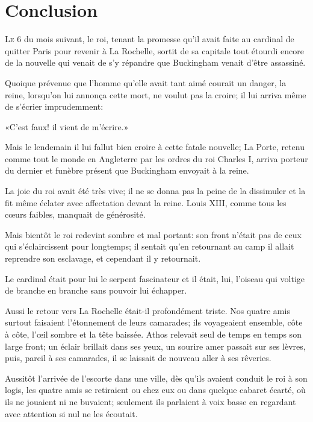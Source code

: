 
\chapter{Conclusion}

\lettrine{L}{e} 6 du mois suivant, le roi, tenant la promesse qu'il avait faite au cardinal de quitter Paris pour revenir à La Rochelle, sortit de sa capitale tout étourdi encore de la nouvelle qui venait de s'y répandre que Buckingham venait d'être assassiné. 

Quoique prévenue que l'homme qu'elle avait tant aimé courait un danger, la reine, lorsqu'on lui annonça cette mort, ne voulut pas la croire; il lui arriva même de s'écrier imprudemment: 

«C'est faux! il vient de m'écrire.» 

Mais le lendemain il lui fallut bien croire à cette fatale nouvelle; La Porte, retenu comme tout le monde en Angleterre par les ordres du roi Charles I\ier, arriva porteur du dernier et funèbre présent que Buckingham envoyait à la reine. 

La joie du roi avait été très vive; il ne se donna pas la peine de la dissimuler et la fit même éclater avec affectation devant la reine. Louis XIII, comme tous les cœurs faibles, manquait de générosité. 

Mais bientôt le roi redevint sombre et mal portant: son front n'était pas de ceux qui s'éclaircissent pour longtemps; il sentait qu'en retournant au camp il allait reprendre son esclavage, et cependant il y retournait. 

Le cardinal était pour lui le serpent fascinateur et il était, lui, l'oiseau qui voltige de branche en branche sans pouvoir lui échapper. 

Aussi le retour vers La Rochelle était-il profondément triste. Nos quatre amis surtout faisaient l'étonnement de leurs camarades; ils voyageaient ensemble, côte à côte, l'œil sombre et la tête baissée. Athos relevait seul de temps en temps son large front; un éclair brillait dans ses yeux, un sourire amer passait sur ses lèvres, puis, pareil à ses camarades, il se laissait de nouveau aller à ses rêveries. 

Aussitôt l'arrivée de l'escorte dans une ville, dès qu'ils avaient conduit le roi à son logis, les quatre amis se retiraient ou chez eux ou dans quelque cabaret écarté, où ils ne jouaient ni ne buvaient; seulement ils parlaient à voix basse en regardant avec attention si nul ne les écoutait. 

